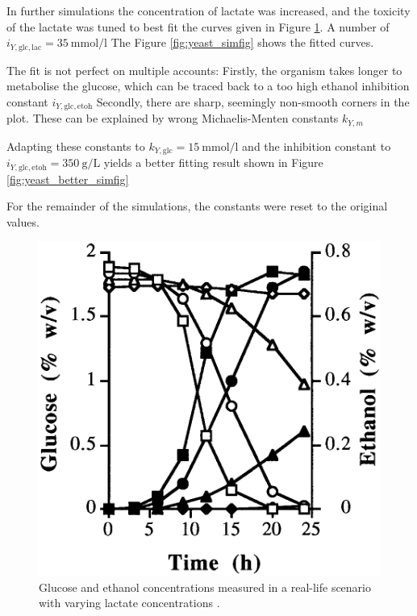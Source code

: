 		In further simulations the concentration of lactate was increased, and the toxicity of the lactate was tuned to best fit the curves given in Figure \ref{fig:yeast_real}.
		A number of $i_{Y,\mathrm{glc,lac}}=\SI{35}{\milli\mole\per\litre}$
		The Figure \ref{fig:yeast_simfig} shows the fitted curves.
		
		The fit is not perfect on multiple accounts: Firstly, the organism takes longer to metabolise the glucose, which can be traced back to a too high ethanol inhibition constant $i_{Y,\mathrm{glc,etoh}}$
		Secondly, there are sharp, seemingly non-smooth corners in the plot. These can be explained by wrong Michaelis-Menten constants $k_{Y,m}$
		
		Adapting these constants to $k_{Y,\mathrm{glc}}=\SI{15}{\milli\mole\per\litre}$ and the inhibition constant to $i_{Y,\mathrm{glc,etoh}}=\SI{350}{\gram\per\liter}$ yields a better fitting result
		shown in Figure \ref{fig:yeast_better_simfig}
		
		For the remainder of the simulations, the constants were reset to the original values.
		
		\begin{figure}[h]
			\centering
			\includegraphics[width=0.75\linewidth]{figures/yeast_real.png}
			\caption{Glucose and ethanol concentrations measured in a real-life scenario with varying lactate concentrations \cite{Narendranath2001}. }
			\label{fig:yeast_real}
		\end{figure}
		
